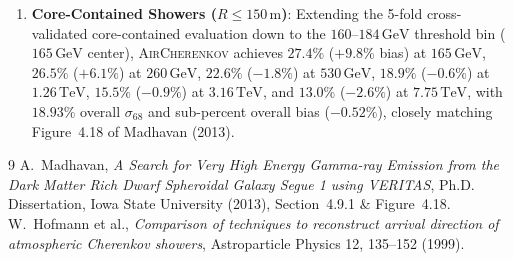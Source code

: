 \documentclass[11pt,a4paper]{article}
\begin{document}
\begin{enumerate}
    \item \textbf{Core-Contained Showers ($R \le 150\,\text{m}$)}: Extending the 5-fold cross-validated core-contained evaluation down to the $160\text{--}184\,\text{GeV}$ threshold bin ($165\,\text{GeV}$ center), \textsc{AirCherenkov} achieves $\mathbf{27.4\%}$ ($+9.8\%$ bias) at $165\,\text{GeV}$, $\mathbf{26.5\%}$ ($+6.1\%$) at $260\,\text{GeV}$, $\mathbf{22.6\%}$ ($-1.8\%$) at $530\,\text{GeV}$, $\mathbf{18.9\%}$ ($-0.6\%$) at $1.26\,\text{TeV}$, $\mathbf{15.5\%}$ ($-0.9\%$) at $3.16\,\text{TeV}$, and $\mathbf{13.0\%}$ ($-2.6\%$) at $7.75\,\text{TeV}$, with $\mathbf{18.93\%}$ overall $\sigma_{68}$ and sub-percent overall bias ($\mathbf{-0.52\%}$), closely matching Figure~4.18 of Madhavan (2013).
\end{enumerate}

\begin{thebibliography}{9}
A.~Madhavan, \emph{A Search for Very High Energy Gamma-ray Emission from the Dark Matter Rich Dwarf Spheroidal Galaxy Segue 1 using VERITAS}, Ph.D. Dissertation, Iowa State University (2013), Section~4.9.1 \& Figure~4.18.
W.~Hofmann et al., \emph{Comparison of techniques to reconstruct arrival direction of atmospheric Cherenkov showers}, Astroparticle Physics 12, 135--152 (1999).
\end{thebibliography}
\end{document}
